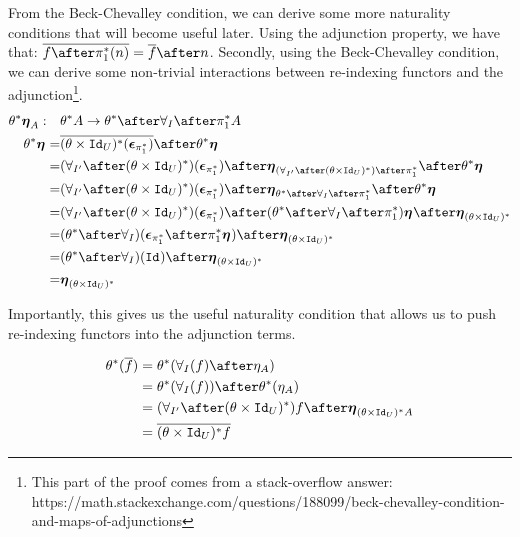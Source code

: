 \documentclass{Report}
\begin{document}
From the Beck-Chevalley condition, we can derive some more naturality conditions that will become useful later.
Using the adjunction property, we have that: $\bar{f\after\pstar(n)} = \bar{f}\after n$. Secondly, using the Beck-Chevalley condition, we can derive some non-trivial interactions between re-indexing functors and the adjunction\footnote{This part of the proof comes from a stack-overflow answer: https://math.stackexchange.com/questions/188099/beck-chevalley-condition-and-maps-of-adjunctions}. 
    \begin{align*}
        \theta\star\unit{A}:\quad&\theta\star A \rightarrow \theta\star\after\allI\after\pstar A\\
        \theta\star\unit{} =& \bar{(\theta\times\Id{U})\star(\counit{\pstar})}\after\theta\star\unit{}\\
        =& (\allII\after(\theta\times\Id{U})\star)(\counit{\pstar})\after\unit{(\allII\after(\theta\times\Id{U})\star)\after\pstar}\after\theta\star\unit{}\\
        = & (\allII\after(\theta\times\Id{U})\star)(\counit{\pstar})\after\unit{\theta\star\after\allI\after\pstar}\after\theta\star\unit{}\\
        = & (\allII\after(\theta\times\Id{U})\star)(\counit{\pstar}) \after(\theta\star\after\allI\after\pstar)\unit{} \after\unit{(\theta\times\Id{U})\star}\\
        = & (\theta\star\after\allI)(\counit{\pstar}
        \after\pstar\unit{})\after\unit{(\theta\times\Id{U})\star}\\
        = & (\theta\star\after\allI)(\Id{})\after\unit{(\theta\times\Id{U})\star}\\
        = & \unit{(\theta\times\Id{U})\star}
    \end{align*}

    Importantly, this gives us the useful naturality condition that allows us to push re-indexing functors into the adjunction terms.

    \begin{align}\label{NaturalityCondition}
        \theta\star(\bar{f}) & = \theta\star(\allI(f)\after\eta_A)\\
        & = \theta\star(\allI(f))\after\theta\star(\eta_A)\\
        & =  (\allII\after(\theta\times\Id{U})\star)f \after\unit{(\theta\times\Id{U})\star A}\\
        & = \bar{(\theta\times\Id{U})\star f}\\
    \end{align}
\end{document}
